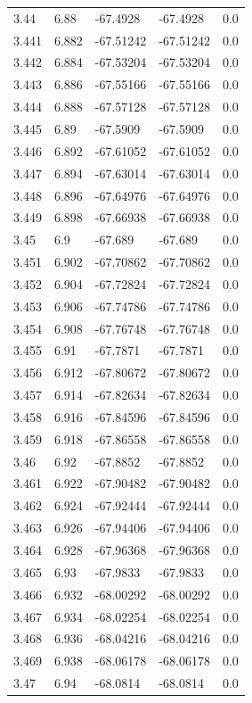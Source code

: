\begin{tabular}{lllll}
3.44 & 6.88 & -67.4928 & -67.4928 & 0.0 \\
3.441 & 6.882 & -67.51242 & -67.51242 & 0.0 \\
3.442 & 6.884 & -67.53204 & -67.53204 & 0.0 \\
3.443 & 6.886 & -67.55166 & -67.55166 & 0.0 \\
3.444 & 6.888 & -67.57128 & -67.57128 & 0.0 \\
3.445 & 6.89 & -67.5909 & -67.5909 & 0.0 \\
3.446 & 6.892 & -67.61052 & -67.61052 & 0.0 \\
3.447 & 6.894 & -67.63014 & -67.63014 & 0.0 \\
3.448 & 6.896 & -67.64976 & -67.64976 & 0.0 \\
3.449 & 6.898 & -67.66938 & -67.66938 & 0.0 \\
3.45 & 6.9 & -67.689 & -67.689 & 0.0 \\
3.451 & 6.902 & -67.70862 & -67.70862 & 0.0 \\
3.452 & 6.904 & -67.72824 & -67.72824 & 0.0 \\
3.453 & 6.906 & -67.74786 & -67.74786 & 0.0 \\
3.454 & 6.908 & -67.76748 & -67.76748 & 0.0 \\
3.455 & 6.91 & -67.7871 & -67.7871 & 0.0 \\
3.456 & 6.912 & -67.80672 & -67.80672 & 0.0 \\
3.457 & 6.914 & -67.82634 & -67.82634 & 0.0 \\
3.458 & 6.916 & -67.84596 & -67.84596 & 0.0 \\
3.459 & 6.918 & -67.86558 & -67.86558 & 0.0 \\
3.46 & 6.92 & -67.8852 & -67.8852 & 0.0 \\
3.461 & 6.922 & -67.90482 & -67.90482 & 0.0 \\
3.462 & 6.924 & -67.92444 & -67.92444 & 0.0 \\
3.463 & 6.926 & -67.94406 & -67.94406 & 0.0 \\
3.464 & 6.928 & -67.96368 & -67.96368 & 0.0 \\
3.465 & 6.93 & -67.9833 & -67.9833 & 0.0 \\
3.466 & 6.932 & -68.00292 & -68.00292 & 0.0 \\
3.467 & 6.934 & -68.02254 & -68.02254 & 0.0 \\
3.468 & 6.936 & -68.04216 & -68.04216 & 0.0 \\
3.469 & 6.938 & -68.06178 & -68.06178 & 0.0 \\
3.47 & 6.94 & -68.0814 & -68.0814 & 0.0 \\

\end{tabular}
